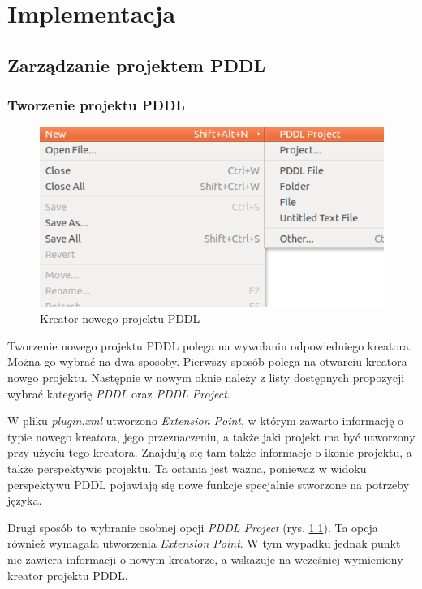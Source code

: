 \chapter{Implementacja}
\label{sec:implementacja}
\section{Zarządzanie projektem PDDL}
\label{sec:zarzadzanie}
\subsection{Tworzenie projektu PDDL}
\begin{figure}[h]
  \centering
    \includegraphics[width=12cm,keepaspectratio]{img/new-project.png}
    \caption{Kreator nowego projektu PDDL}
    \label{fig:impl:new-project}
\end{figure}
Tworzenie nowego projektu PDDL polega na wywołaniu odpowiedniego kreatora. Moż\-na go wybrać na dwa sposoby. Pierwszy sposób polega na otwarciu kreatora nowgo projektu. Następnie w nowym oknie należy z listy dostępnych propozycji wybrać kategorię \emph{PDDL} oraz \emph{PDDL Project}. 

W pliku \emph{plugin.xml} utworzono \emph{Extension Point}, w którym zawarto informację o typie nowego kreatora, jego przeznaczeniu, a także jaki projekt ma być utworzony przy użyciu tego kreatora. Znajdują się tam także informacje o ikonie projektu, a także perspektywie projektu. Ta ostania jest ważna, ponieważ w widoku perspektywu PDDL pojawiają się nowe funkcje specjalnie stworzone na potrzeby języka. 

Drugi sposób to wybranie osobnej opcji \emph{PDDL Project} (rys. \ref{fig:impl:new-project}). Ta opcja również wymagała utworzenia \emph{Extension Point}. W tym wypadku jednak punkt nie zawiera informacji o nowym kreatorze, a wskazuje na wcześniej wymieniony kreator projektu PDDL.

